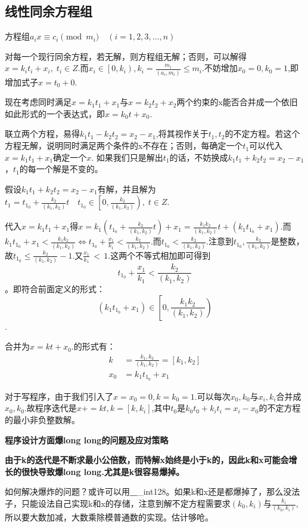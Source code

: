 	\subsection{线性同余方程组}
		\par 方程组$a_ix \equiv c_i \pmod{m_i} \quad (i=1, 2, 3, \ldots, n)$
		\par 对每一个现行同余方程，若无解，则方程组无解；否则，可以解得$x=k_it_i+x_i, \; t_i \in Z$.而$x_i \in \left[0,k_i\right), k_i = \frac{m_i}{(a_i,m_i)} \leq m_i$.不妨增加$x_0=0,k_0=1$,即增加式子$x=t_0+0$.
		\par 现在考虑同时满足$x=k_1t_1+x_1$与$x=k_2t_2+x_2$两个约束的x能否合并成一个依旧如此形式的一个表达式，即$x=k_0t+x_0$.
		\par 联立两个方程，易得$k_1t_1-k_2t_2=x_2-x_1$,将其视作关于$t_1,t_2$的不定方程。若这个方程无解，说明同时满足两个条件的x不存在；否则，每确定一个$t_1$可以代入$x=k_1t_1+x_1$确定一个$x$. 如果我们只是解出$t_1$的话，不妨换成$k_1t_1+k_2t_2=x_2-x_1$，$t_1$的每一个解是不变的。
		\par 假设$k_1t_1+k_2t_2=x_2-x_1$有解，并且解为$t_1=t_{1_0}+\frac{k_2}{(k_1,k_2)}t \quad t_{1_0} \in \left[ 0,\frac{k_2}{(k_1,k_2)} \right), \; t \in Z$.
		\par 代入$x=k_1t_1+x_1$得$x=k_1(t_{1_0}+\frac{k_2}{(k_1,k_2)}t)+x_1=\frac{k_1k_2}{(k_1,k_2)}t+(k_1t_{1_0}+x_1)$.而$k_1t_{1_0}+x_1 < \frac{k_1k_2}{(k_1,k_2)} \Longleftrightarrow t_{1_0}+\frac{x_1}{k_1} < \frac{k_2}{(k_1,k_2)}$.而$t_{1_0} < \frac{k_2}{(k_1,k_2)}$.注意到$t_{1_0},\frac{k_2}{(k_1,k_2)}$是整数，故$t_{1_0} \leq \frac{k_2}{(k_1,k_2)}-1$.又$\frac{x_1}{k_1}\, <\, 1$.这两个不等式相加即可得到$$t_{1_0}+\frac{x_1}{k_1} < \frac{k_2}{(k_1,k_2)}$$。即符合前面定义的形式：$$(k_1t_{1_0}+x_1) \in \left[0, \frac{k_1k_2}{(k_1,k_2)}\right)$$.
		\par 合并为$x=kt+x_0.$的形式有：\begin{align*}
			k &=\frac{k_1,k_2}{(k_1,k_2)}=[k_1,k_2] \\
			x_0 &=k_1t_{1_0}+x_1
		\end{align*}
		\par 对于写程序，由于我们引入了$x=x_0=0,k=k_0=1$.可以每次$x_0,k_0$与$x_i,k_i$合并成$x_0,k_0$.故程序迭代是$x+=kt,k=[k,k_i]$,其中$t_0$是$k_0t_0+k_it_i=x_i-x_0$的不定方程的最小非负整数解。
		\par {\bfseries 程序设计方面爆long long的问题及应对策略}
		\par {\bfseries 由于k的迭代是不断求最小公倍数，而特解x始终是小于k的，因此k和x可能会增长的很快导致爆long long.尤其是k很容易爆掉。}
		\par 如何解决爆炸的问题？或许可以用{\textbf \_\_int128}。如果k和x还是都爆掉了，那么没法子，只能设法自己实现k和x的存储，注意到解不定方程需要求$(k_0,k_i)$与$\frac{k_i}{(k_0,k_i)}$,所以要大数加减，大数乘除模普通数的实现。估计够呛。
